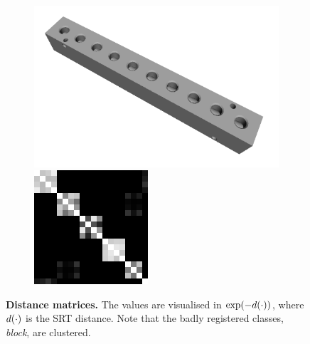 \begin{figure}[ht]
\begin{subfigure}[b]{0.23\linewidth}
		\includegraphics[width=\linewidth]{fig/reg/block.png} \\
		\includegraphics[width=\linewidth]{fig/reg/reg3Dtrain_block.png} 
	\end{subfigure}
	\caption{\textbf{Distance matrices.} The values are visualised in $\exp(-d(\cdot))$, where $d(\cdot)$ is the SRT distance. Note that the badly registered classes, \eg \emph{block}, are clustered.}
	\label{fig/reg/reg_srtmatrices}
\end{figure}

